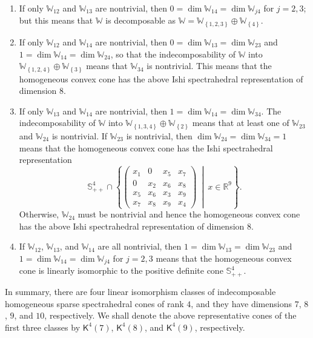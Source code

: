 \documentclass[oneside]{amsart}
\theoremstyle{plain}
\theoremstyle{definition}
\theoremstyle{remark}
\numberwithin{equation}{section}
\begin{document}
\begin{enumerate}[label=(\roman*)]
\item If only $\mathbb{W}_{12}$ and $\mathbb{W}_{13}$ are nontrivial, then
$0 = \dim \mathbb{W}_{14} = \dim \mathbb{W}_{j4}$ for $j = 2, 3$; but this
means that $\mathbb{W}$ is decomposable as $\mathbb{W} =
\mathbb{W}_{\left\{1,2,3\right\}} \oplus \mathbb{W}_{\left\{4\right\}}$.

\item If only $\mathbb{W}_{12}$ and $\mathbb{W}_{14}$ are nontrivial, then
$0 = \dim \mathbb{W}_{13} = \dim \mathbb{W}_{23}$ and $1 = \dim
\mathbb{W}_{14} = \dim \mathbb{W}_{24}$, so that the indecomposability of
$\mathbb{W}$ into $\mathbb{W}_{\left\{1,2,4\right\}} \oplus
\mathbb{W}_{\left\{3\right\}}$ means that $\mathbb{W}_{34}$ is nontrivial.
This means that the homogeneous convex cone has the above Ishi
spectrahedral representation of dimension $8$.

\item If only $\mathbb{W}_{13}$ and $\mathbb{W}_{14}$ are nontrivial, then
$1 = \dim \mathbb{W}_{14} = \dim \mathbb{W}_{34}$. The indecomposability of
$\mathbb{W}$ into $\mathbb{W}_{\left\{1,3,4\right\}} \oplus
\mathbb{W}_{\left\{2\right\}}$ means that at least one of $\mathbb{W}_{23}$
and $\mathbb{W}_{24}$ is nontrivial. If $\mathbb{W}_{23}$ is nontrivial,
then $\dim \mathbb{W}_{24} = \dim \mathbb{W}_{34} = 1$ means that the
homogeneous convex cone has the Ishi spectrahedral representation
\[
\mathbb{S}^{4}_{++} \cap \left\{
\begin{pmatrix}
x_{1} & 0 & x_{5} & x_{7}
\\
0 & x_{2} & x_{6} & x_{8}
\\
x_{5} & x_{6} & x_{3} & x_{9}
\\
x_{7} & x_{8} & x_{9} & x_{4}
\end{pmatrix}
\ \middle|\ x \in \mathbb{R}^{9}\right\}.
\]
Otherwise, $\mathbb{W}_{24}$ must be nontrivial and hence the homogeneous
convex cone has the above Ishi spectrahedral representation of dimension
$8$.

\item If $\mathbb{W}_{12}$, $\mathbb{W}_{13}$, and $\mathbb{W}_{14}$ are
all nontrivial, then $1 = \dim \mathbb{W}_{13} = \dim \mathbb{W}_{23}$ and
$1 = \dim \mathbb{W}_{14} = \dim \mathbb{W}_{j4}$ for $j = 2, 3$ means that
the homogeneous convex cone is linearly isomorphic to the positive definite
cone $\mathbb{S}^{4}_{++}$.

\end{enumerate}
In summary, there are four linear isomorphism classes of indecomposable
homogeneous sparse spectrahedral cones of rank $4$, and they have
dimensions $7$, $8$, $9$, and $10$, respectively. We shall denote the above
representative cones of the first three classes by $\mathsf{K}^{4}(7)$,
$\mathsf{K}^{4}(8)$, and $\mathsf{K}^{4}(9)$, respectively.
\end{document}
